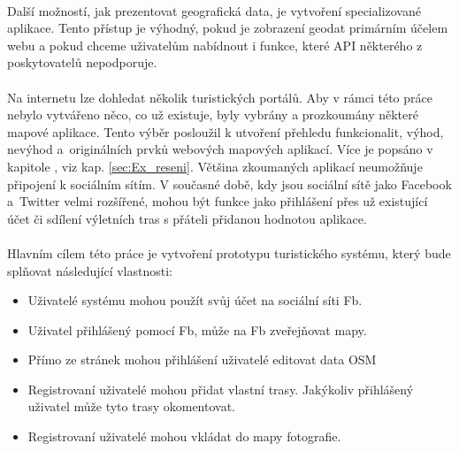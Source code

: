 \documentclass[11pt,a4paper,titlepage,oneside]{book}
\begin{document}
	\paragraph{}Další možností, jak prezentovat geografická data, je vytvoření specializované aplikace. Tento přístup je výhodný, pokud je zobrazení geodat primárním účelem webu a pokud chceme uživatelům nabídnout i funkce, které \ac{API} některého z poskytovatelů nepodporuje. 



	\paragraph{} Na internetu lze dohledat několik turistických portálů. Aby v rámci této práce nebylo vytvářeno něco, co už existuje, byly vybrány a prozkoumány některé mapové aplikace. Tento výběr posloužil k utvoření přehledu funkcionalit, výhod, nevýhod a~originálních prvků webových mapových aplikací. Více je popsáno v kapitole , viz kap. \ref{sec:Ex_reseni}. Většina zkoumaných aplikací neumožňuje připojení k sociálním sítím. V současné době, kdy jsou sociální sítě jako Facebook a~Twitter velmi rozšířené, mohou být funkce jako přihlášení přes už existující účet či sdílení výletních tras s přáteli přidanou hodnotou aplikace. 


	\paragraph{} Hlavním cílem této práce je vytvoření prototypu turistického systému, který bude splňovat následující vlastnosti:
		\begin{itemize}
			\item Uživatelé systému mohou použít svůj účet na sociální síti \ac{Fb}.
			\item Uživatel přihlášený pomocí \ac{Fb}, může na \ac{Fb} zveřejňovat mapy.
			\item Přímo ze stránek mohou přihlášení uživatelé editovat data \ac{OSM}
			\item Registrovaní uživatelé mohou přidat vlastní trasy. Jakýkoliv přihlášený uživatel může tyto trasy okomentovat.
			\item Registrovaní uživatelé mohou vkládat do mapy fotografie.
		\end{itemize}
\end{document}

